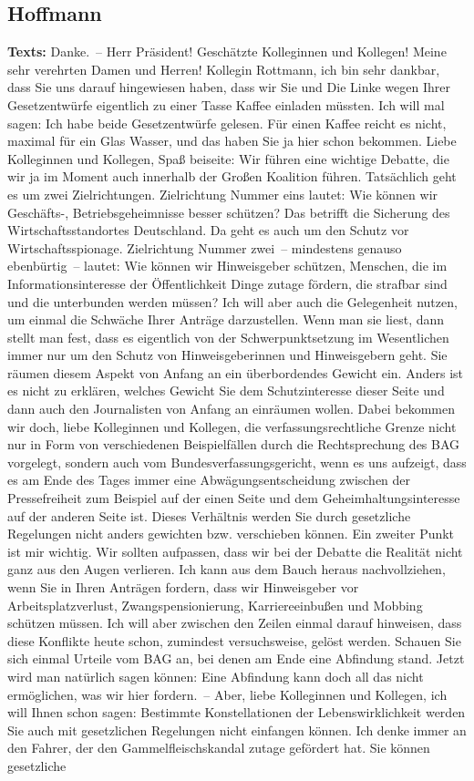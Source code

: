 \documentclass{article}
\begin{document}
\subsection{Hoffmann}
\noindent\textbf{Texts:} Danke. – Herr Präsident! Geschätzte Kolleginnen und Kollegen! Meine sehr verehrten Damen und Herren! Kollegin Rottmann, ich bin sehr dankbar, dass Sie uns darauf hingewiesen haben, dass wir Sie und Die Linke wegen Ihrer Gesetzentwürfe eigentlich zu einer Tasse Kaffee einladen müssten. Ich will mal sagen: Ich habe beide Gesetzentwürfe gelesen.  Für einen Kaffee reicht es nicht, maximal für ein Glas Wasser, und das haben Sie ja hier schon bekommen.  Liebe Kolleginnen und Kollegen, Spaß beiseite: Wir führen eine wichtige Debatte, die wir ja im Moment auch innerhalb der Großen Koalition führen. Tatsächlich geht es um zwei Zielrichtungen. Zielrichtung Nummer eins lautet: Wie können wir Geschäfts-, Betriebsgeheimnisse besser schützen? Das betrifft die Sicherung des Wirtschaftsstandortes Deutschland. Da geht es auch um den Schutz vor Wirtschaftsspionage. Zielrichtung Nummer zwei – mindestens genauso ebenbürtig – lautet: Wie können wir Hinweisgeber schützen, Menschen, die im Informationsinteresse der Öffentlichkeit Dinge zutage fördern, die strafbar sind und die unterbunden werden müssen? Ich will aber auch die Gelegenheit nutzen, um einmal die Schwäche Ihrer Anträge darzustellen.  Wenn man sie liest, dann stellt man fest, dass es eigentlich von der Schwerpunktsetzung im Wesentlichen immer nur um den Schutz von Hinweisgeberinnen und Hinweisgebern geht. Sie räumen diesem Aspekt von Anfang an ein überbordendes Gewicht ein.  Anders ist es nicht zu erklären, welches Gewicht Sie dem Schutzinteresse dieser Seite und dann auch den Journalisten von Anfang an einräumen wollen.  Dabei bekommen wir doch, liebe Kolleginnen und Kollegen, die verfassungsrechtliche Grenze nicht nur in Form von verschiedenen Beispielfällen durch die Rechtsprechung des BAG vorgelegt, sondern auch vom Bundesverfassungsgericht, wenn es uns aufzeigt, dass es am Ende des Tages immer eine Abwägungsentscheidung zwischen der Pressefreiheit zum Beispiel auf der einen Seite und dem Geheimhaltungsinteresse auf der anderen Seite ist. Dieses Verhältnis werden Sie durch gesetzliche Regelungen nicht anders gewichten bzw. verschieben können. Ein zweiter Punkt ist mir wichtig. Wir sollten aufpassen, dass wir bei der Debatte die Realität nicht ganz aus den Augen verlieren. Ich kann aus dem Bauch heraus nachvollziehen, wenn Sie in Ihren Anträgen fordern, dass wir Hinweisgeber vor Arbeitsplatzverlust, Zwangspensionierung, Karriereeinbußen und Mobbing schützen müssen. Ich will aber zwischen den Zeilen einmal darauf hinweisen, dass diese Konflikte heute schon, zumindest versuchsweise, gelöst werden. Schauen Sie sich einmal Urteile vom BAG an, bei denen am Ende eine Abfindung stand. Jetzt wird man natürlich sagen können: Eine Abfindung kann doch all das nicht ermöglichen, was wir hier fordern. – Aber, liebe Kolleginnen und Kollegen, ich will Ihnen schon sagen: Bestimmte Konstellationen der Lebenswirklichkeit werden Sie auch mit gesetzlichen Regelungen nicht einfangen können. Ich denke immer an den Fahrer, der den Gammelfleischskandal zutage gefördert hat. Sie können gesetzliche 
\end{document}
